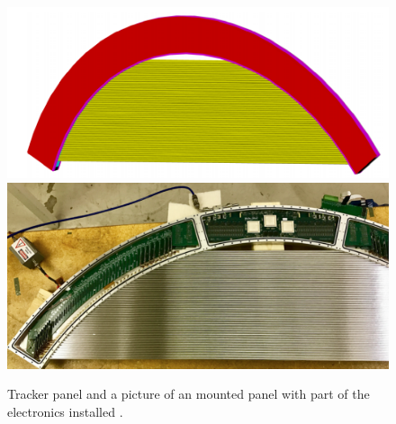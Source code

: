 \documentclass[12pt,a4paper,openright, oneside, titlepage]{book} %
\begin{document}
\begin{figure}[h!]
\centering
\includegraphics[scale=0.2]{Tracker_panel}
\includegraphics[scale=0.25]{Tracker_panel_picture}
\caption[A panel of the tracker]{Tracker panel \cite{MTDR} and a picture of an mounted panel with part of the electronics installed \cite{Manolis}.}
\label{_Tracker_panel}
\end{figure}
\end{document}
